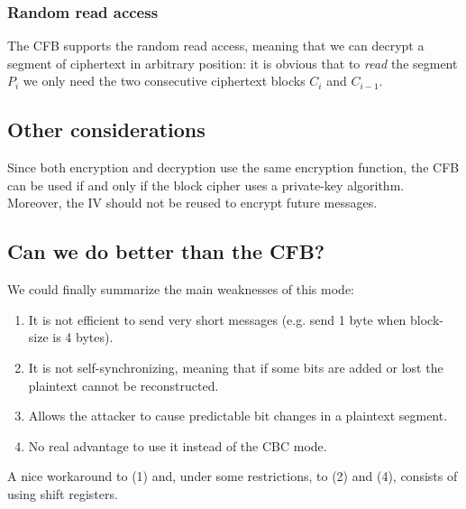 \documentclass[11 pt]{article}
\begin{document}
\subsubsection{Random read access}
The CFB supports the random read access, meaning that we can decrypt a segment of ciphertext in arbitrary position: it is obvious that to \textit{read} the segment $P_i$ we only need the two consecutive ciphertext blocks $C_i$ and $C_{i-1}$.
\subsection{Other considerations}
Since both encryption and decryption use the same encryption function, the CFB can be used if and only if the block cipher uses a private-key algorithm. Moreover, the IV should not be reused to encrypt future messages.
\subsection{Can we do better than the CFB?}
We could finally summarize the main weaknesses of this mode:
\begin{enumerate}
	\item It is not efficient to send very short messages (e.g. send 1 byte when block-size is 4 bytes).
	\item It is not self-synchronizing, meaning that if some bits are added or lost the plaintext cannot be reconstructed.
	\item Allows the attacker to cause predictable bit changes in a plaintext segment.
	\item No real advantage to use it instead of the CBC mode. \cite{Crypto Book}
\end{enumerate}
A nice workaround to (1) and, under some restrictions, to (2) and (4), consists of using shift registers.  
\end{document}
